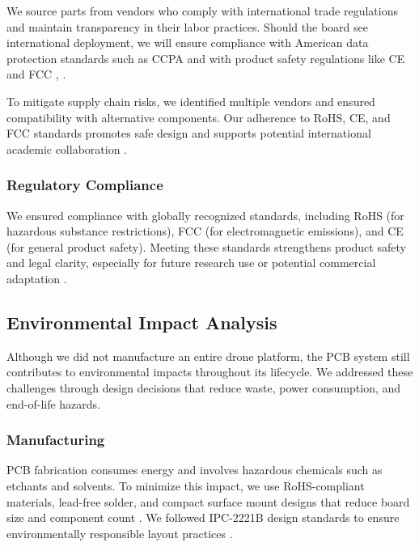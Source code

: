 \documentclass[12pt]{article}
\begin{document}
\par We source parts from vendors who comply with international trade regulations and maintain transparency in their labor practices. Should the board see international deployment, we will ensure compliance with American data protection standards such as CCPA and with product safety regulations like CE and FCC \cite{rohs}, \cite{ccpa}.

\par To mitigate supply chain risks, we identified multiple vendors and ensured compatibility with alternative components. Our adherence to RoHS, CE, and FCC standards promotes safe design and supports potential international academic collaboration \cite{rohs}.

\subsubsection{Regulatory Compliance}

\par We ensured compliance with globally recognized standards, including RoHS (for hazardous substance restrictions), FCC (for electromagnetic emissions), and CE (for general product safety). Meeting these standards strengthens product safety and legal clarity, especially for future research use or potential commercial adaptation \cite{rohs}.

\subsection{Environmental Impact Analysis}

\par Although we did not manufacture an entire drone platform, the PCB system still contributes to environmental impacts throughout its lifecycle. We addressed these challenges through design decisions that reduce waste, power consumption, and end-of-life hazards.

\subsubsection{Manufacturing}

\par PCB fabrication consumes energy and involves hazardous chemicals such as etchants and solvents. To minimize this impact, we use RoHS-compliant materials, lead-free solder, and compact surface mount designs that reduce board size and component count \cite{rohs}. We followed IPC-2221B design standards to ensure environmentally responsible layout practices \cite{ipc2221}.
\end{document}
